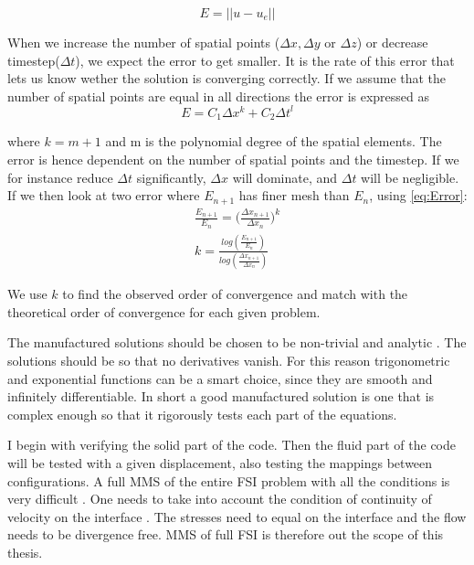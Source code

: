 \begin{equation}
E = || u - u_e ||
\end{equation}

When we increase the number of spatial points ($ \Delta x, \Delta y$ or $ \Delta z$) or decrease timestep($\Delta t$), we expect the error to get smaller. It is the rate of this error that lets us know wether the solution is converging correctly.
If we assume that the number of spatial points are equal in all directions the error is expressed as
\begin{equation}
\label{eq:Error}
 E = C_1 \Delta x^k+ C_2 \Delta t^l 
\end{equation}

where $ k = m+1 $ and m is the polynomial degree of the spatial elements. The error is hence dependent on the number of spatial points and the timestep.
If we for instance reduce $\Delta t$ significantly, $\Delta x$ will dominate, and $\Delta t$ will be negligible. If we then look at two error where $E_{n+1}$ has finer mesh than $E_n$, using \eqref{eq:Error}:
\begin{align}
\frac{E_{n+1}}{E_n} = \big( \frac{\Delta x_{n+1}}{\Delta x_n} \big)^k \\
k = \frac{log( \frac{E_{n+1}}{E_n}) }{ log(\frac{\Delta x_{n+1}}{\Delta x_n})}
\end{align}

We use $k$ to find the observed order of convergence and match with the theoretical order of convergence for each given problem.\newline

The manufactured solutions should be chosen to be non-trivial and analytic \cite{Roache2002} \cite{Oberkampf2010}. The solutions should be so that no derivatives vanish. For this reason trigonometric and exponential functions can be a smart choice, since they are smooth and infinitely differentiable. In short a good manufactured solution is one that is complex enough so that it rigorously tests each part of the equations.\newline 

I begin with verifying the solid part of the code. Then the fluid part of the code will be tested with a given displacement, also testing the mappings between configurations. A full MMS of the entire FSI problem with all the conditions is very difficult \cite{Etienne2012}. One needs to take into account the condition of continuity of velocity on the interface \cite{Etienne2006}. The stresses need to equal on the interface and the flow needs to be divergence free. MMS of full FSI is therefore  out the scope of this thesis. 


